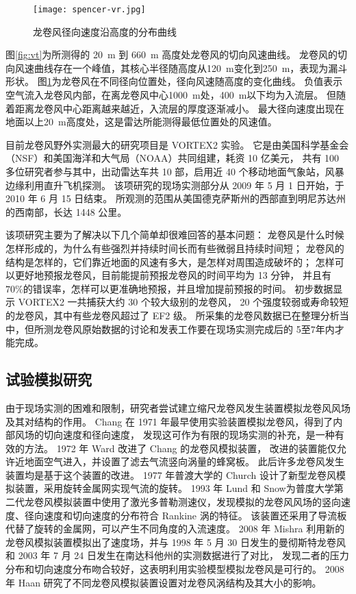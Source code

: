 \begin{figure}[!htbp]
    \centering
    \texttt{[image: spencer-vr.jpg]}
    \caption{龙卷风径向速度沿高度的分布曲线}
    \label{fig:vr}
\end{figure}

图\ref{fig:vt}为所测得的 \SI{20}{m} 到 \SI{660}{m} 高度处龙卷风的切向风速曲线。
龙卷风的切向风速曲线存在一个峰值，其核心半径随高度从\SI{120}{m}变化到\SI{250}{m}，表现为漏斗形状。
图\ref{fig:vr}为龙卷风在不同径向位置处，径向风速随高度的变化曲线。
负值表示空气流入龙卷风内部，在离龙卷风中心\SI{1000}{m}处，\SI{400}{m}以下均为入流层。
但随着距离龙卷风中心距离越来越近，入流层的厚度逐渐减小。
最大径向速度出现在地面以上\SI{20}{m}高度处，这是雷达所能测得最低位置处的风速值。

目前龙卷风野外实测最大的研究项目是 VORTEX2 实验。
它是由美国科学基金会（NSF）和美国海洋和大气局（NOAA）共同组建，耗资 10 亿美元，
共有 100 多位研究者参与其中，出动雷达车共 10 部，启用近 40 个移动地面气象站，风暴边缘利用直升飞机探测。
该项研究的现场实测部分从 2009 年 5 月 1 日开始，于 2010 年 6 月 15 日结束。
所观测的范围从美国德克萨斯州的西部直到明尼苏达州的西南部，长达 1448 公里。

该项研究主要为了解决以下几个简单却很难回答的基本问题：
龙卷风是什么时候怎样形成的，为什么有些强烈并持续时间长而有些微弱且持续时间短；
龙卷风的结构是怎样的，它们靠近地面的风速有多大，是怎样对周围造成破坏的；
怎样可以更好地预报龙卷风，目前能提前预报龙卷风的时间平均为 13 分钟，
并且有 $70\%$的错误率，怎样可以更准确地预报，并且增加提前预报的时间。
初步数据显示 VORTEX2 一共捕获大约 30 个较大级别的龙卷风，
20 个强度较弱或寿命较短的龙卷风，其中有些龙卷风超过了 EF2 级。
所采集的龙卷风数据已在整理分析当中，但所测龙卷风原始数据的讨论和发表工作要在现场实测完成后的 5至7年内才能完成。

\subsection{试验模拟研究}
由于现场实测的困难和限制，研究者尝试建立缩尺龙卷风发生装置模拟龙卷风风场及其对结构的作用。
Chang \cite{chang1971tornado}在 1971 年最早使用实验装置模拟龙卷风，得到了内部风场的切向速度和径向速度，
发现这可作为有限的现场实测的补充，是一种有效的方法。
1972 年 Ward \cite{ward1972exploration}改进了 Chang 的龙卷风模拟装置，
改进的装置能仅允许近地面空气进入，并设置了滤去气流竖向涡量的蜂窝板。
此后许多龙卷风发生装置均是基于这个装置的改进。
1977 年普渡大学的 Church \cite{church1977tornado}设计了新型龙卷风模拟装置，采用旋转金属网实现气流的旋转。
1993 年 Lund 和 Snow为普度大学第二代龙卷风模拟装置中使用了激光多普勒测速仪，发现模拟的龙卷风风场的竖向速度、径向速度和切向速度的分布符合 Rankine 涡的特征。
该装置还采用了导流板代替了旋转的金属网，可以产生不同角度的入流速度。
2008 年 Mishra \cite{mishra2008physical}利用新的龙卷风模拟装置模拟出了速度场，并与 1998 年 5 月 30 日发生的曼彻斯特龙卷风和 2003 年 7 月 24 日发生在南达科他州的实测数据进行了对比，
发现二者的压力分布和切向速度分布吻合较好，这表明利用实验模型模拟龙卷风是可行的。
2008 年 Haan \cite{haan2009tornado}研究了不同龙卷风模拟装置设置对龙卷风涡结构及其大小的影响。


